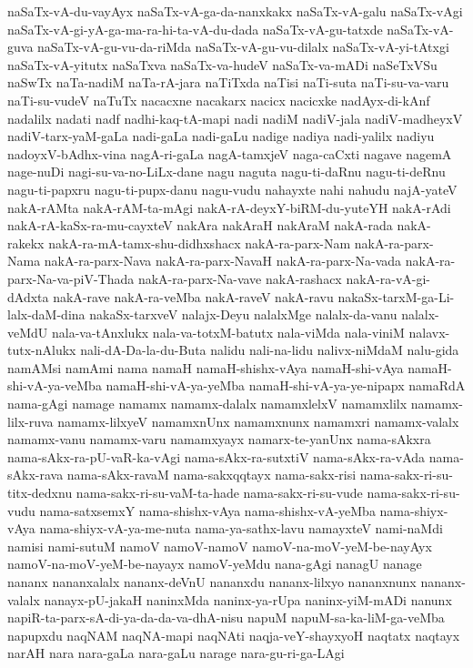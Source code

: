 {naSaTx-vA-du-vayAyx
naSaTx-vA-ga-da-nanxkakx
naSaTx-vA-galu
naSaTx-vAgi
naSaTx-vA-gi-yA-ga-ma-ra-hi-ta-vA-du-dada
naSaTx-vA-gu-tatxde
naSaTx-vA-guva
naSaTx-vA-gu-vu-da-riMda
naSaTx-vA-gu-vu-dilalx
naSaTx-vA-yi-tAtxgi
naSaTx-vA-yitutx
naSaTxva
naSaTx-va-hudeV
naSaTx-va-mADi
naSeTxVSu
naSwTx
naTa-nadiM
naTa-rA-jara
naTiTxda
naTisi
naTi-suta
naTi-su-va-varu
naTi-su-vudeV
naTuTx
nacacxne
nacakarx
nacicx
nacicxke
nadAyx-di-kAnf
nadalilx
nadati
nadf
nadhi-kaq-tA-mapi
nadi
nadiM
nadiV-jala
nadiV-madheyxV
nadiV-tarx-yaM-gaLa
nadi-gaLa
nadi-gaLu
nadige
nadiya
nadi-yalilx
nadiyu
nadoyxV-bAdhx-vina
nagA-ri-gaLa
nagA-tamxjeV
naga-caCxti
nagave
nagemA
nage-nuDi
nagi-su-va-no-LiLx-dane
nagu
naguta
nagu-ti-daRnu
nagu-ti-deRnu
nagu-ti-papxru
nagu-ti-pupx-danu
nagu-vudu
nahayxte
nahi
nahudu
najA-yateV
nakA-rAMta
nakA-rAM-ta-mAgi
nakA-rA-deyxY-biRM-du-yuteYH
nakA-rAdi
nakA-rA-kaSx-ra-mu-cayxteV
nakAra
nakAraH
nakAraM
nakA-rada
nakA-rakekx
nakA-ra-mA-tamx-shu-didhxshacx
nakA-ra-parx-Nam
nakA-ra-parx-Nama
nakA-ra-parx-Nava
nakA-ra-parx-NavaH
nakA-ra-parx-Na-vada
nakA-ra-parx-Na-va-piV-Thada
nakA-ra-parx-Na-vave
nakA-rashacx
nakA-ra-vA-gi-dAdxta
nakA-rave
nakA-ra-veMba
nakA-raveV
nakA-ravu
nakaSx-tarxM-ga-Li-lalx-daM-dina
nakaSx-tarxveV
nalajx-Deyu
nalalxMge
nalalx-da-vanu
nalalx-veMdU
nala-va-tAnxlukx
nala-va-totxM-batutx
nala-viMda
nala-viniM
nalavx-tutx-nAlukx
nali-dA-Da-la-du-Buta
nalidu
nali-na-lidu
nalivx-niMdaM
nalu-gida
namAMsi
namAmi
nama
namaH
namaH-shishx-vAya
namaH-shi-vAya
namaH-shi-vA-ya-veMba
namaH-shi-vA-ya-yeMba
namaH-shi-vA-ya-ye-nipapx
namaRdA
nama-gAgi
namage
namamx
namamx-dalalx
namamxlelxV
namamxlilx
namamx-lilx-ruva
namamx-lilxyeV
namamxnUnx
namamxnunx
namamxri
namamx-valalx
namamx-vanu
namamx-varu
namamxyayx
namarx-te-yanUnx
nama-sAkxra
nama-sAkx-ra-pU-vaR-ka-vAgi
nama-sAkx-ra-sutxtiV
nama-sAkx-ra-vAda
nama-sAkx-rava
nama-sAkx-ravaM
nama-sakxqqtayx
nama-sakx-risi
nama-sakx-ri-su-titx-dedxnu
nama-sakx-ri-su-vaM-ta-hade
nama-sakx-ri-su-vude
nama-sakx-ri-su-vudu
nama-satxsemxY
nama-shishx-vAya
nama-shishx-vA-yeMba
nama-shiyx-vAya
nama-shiyx-vA-ya-me-nuta
nama-ya-sathx-lavu
namayxteV
nami-naMdi
namisi
nami-sutuM
namoV
namoV-namoV
namoV-na-moV-yeM-be-nayAyx
namoV-na-moV-yeM-be-nayayx
namoV-yeMdu
nana-gAgi
nanagU
nanage
nananx
nananxalalx
nananx-deVnU
nananxdu
nananx-lilxyo
nananxnunx
nananx-valalx
nanayx-pU-jakaH
naninxMda
naninx-ya-rUpa
naninx-yiM-mADi
nanunx
napiR-ta-parx-sA-di-ya-da-da-va-dhA-nisu
napuM
napuM-sa-ka-liM-ga-veMba
napupxdu
naqNAM
naqNA-mapi
naqNAti
naqja-veY-shayxyoH
naqtatx
naqtayx
narAH
nara
nara-gaLa
nara-gaLu
narage
nara-gu-ri-ga-LAgi
}
